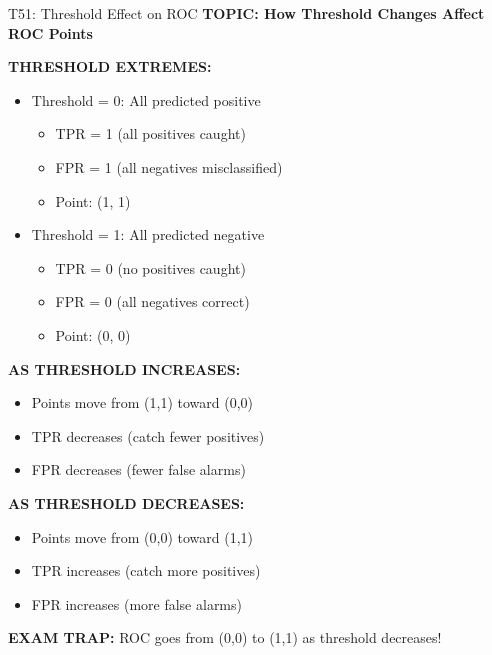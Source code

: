 \documentclass[8pt]{beamer}
\begin{document}
	\begin{frame}{T51: Threshold Effect on ROC}
		\fontsize{6.5}{7.5}\selectfont
		\textbf{TOPIC: How Threshold Changes Affect ROC Points}
		
		\vspace{0.1cm}
		\textbf{THRESHOLD EXTREMES:}
		\begin{itemize}
			\item \textcolor{myblue}{Threshold = 0:} All predicted positive
			\begin{itemize}
				\item TPR = 1 (all positives caught)
				\item FPR = 1 (all negatives misclassified)
				\item Point: (1, 1)
			\end{itemize}
			\item \textcolor{myblue}{Threshold = 1:} All predicted negative
			\begin{itemize}
				\item TPR = 0 (no positives caught)
				\item FPR = 0 (all negatives correct)
				\item Point: (0, 0)
			\end{itemize}
		\end{itemize}
		
		\vspace{0.1cm}
		\textbf{AS THRESHOLD INCREASES:}
		\begin{itemize}
			\item Points move from (1,1) toward (0,0)
			\item TPR decreases (catch fewer positives)
			\item FPR decreases (fewer false alarms)
		\end{itemize}
		
		\vspace{0.1cm}
		\textbf{AS THRESHOLD DECREASES:}
		\begin{itemize}
			\item Points move from (0,0) toward (1,1)
			\item TPR increases (catch more positives)
			\item FPR increases (more false alarms)
		\end{itemize}
		
		\textcolor{myred}{\textbf{EXAM TRAP:}} ROC goes from \textcolor{myblue}{(0,0) to (1,1)} as threshold decreases!
	\end{frame}
	
\end{document}
